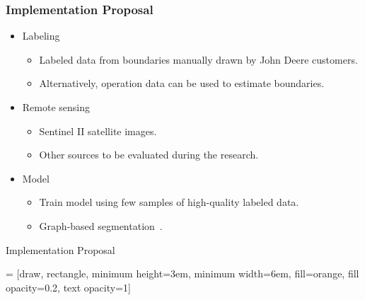 \documentclass[xcolor=table]{beamer}
\begin{document}
\begin{frame}\frametitle{Implementation Proposal} 
	
	\begin{itemize}
		
		\item Labeling
		\begin{itemize}
			\item Labeled data from boundaries manually drawn by John Deere customers.
			\item Alternatively, operation data can be used to estimate boundaries.
		\end{itemize}
        
        \item Remote sensing
		\begin{itemize}
			\item Sentinel II satellite images.
			\item Other sources to be evaluated during the research.
		\end{itemize}
		
		\item Model
		\begin{itemize}
			\item Train model using few samples of high-quality labeled data.
			\item Graph-based segmentation~\cite{felzenszwalb2004}.
		\end{itemize}
	\end{itemize}
	
\end{frame}

\begin{frame}{Implementation Proposal}
	
	\centering
	
 = [draw, rectangle, 
    minimum height=3em, minimum width=6em, fill=orange, fill opacity=0.2, text opacity=1]

\end{frame}
\end{document}
